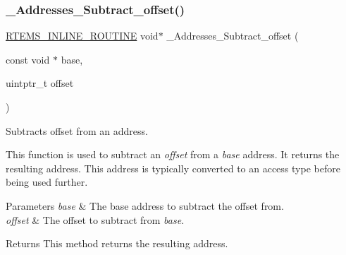 \subsubsection{\texorpdfstring{\_Addresses\_Subtract\_offset()}{\_Addresses\_Subtract\_offset()}}
{\footnotesize\ttfamily \mbox{\hyperlink{group__RTEMSScoreBaseDefs_gac216239df231d5dbd15e3520b0b9313f}{R\+T\+E\+M\+S\+\_\+\+I\+N\+L\+I\+N\+E\+\_\+\+R\+O\+U\+T\+I\+NE}} void$\ast$ \+\_\+\+Addresses\+\_\+\+Subtract\+\_\+offset (\begin{DoxyParamCaption}\item[{const void $\ast$}]{base,  }\item[{uintptr\+\_\+t}]{offset }\end{DoxyParamCaption})}



Subtracts offset from an address. 

This function is used to subtract an {\itshape offset} from a {\itshape base} address. It returns the resulting address. This address is typically converted to an access type before being used further.


\begin{DoxyParams}{Parameters}
{\em base} & The base address to subtract the offset from. \\
\hline
{\em offset} & The offset to subtract from {\itshape base}.\\
\hline
\end{DoxyParams}
\begin{DoxyReturn}{Returns}
This method returns the resulting address. 
\end{DoxyReturn}

